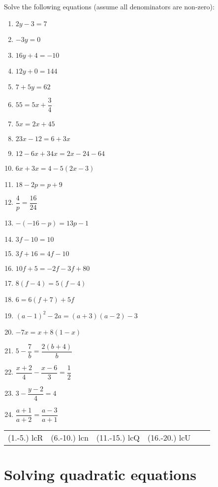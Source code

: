 \begin{exercises}{}
{
Solve the following equations (assume all denominators are non-zero): \\

\begin{multicols}{2}
\begin{enumerate}[itemsep=6pt, label=\textbf{\arabic*}. ] 
\item   $2y-3=7$
\item   $-3y=0$        
\item   $16y+4=-10$        
\item   $12y+0=144$
\item   $7+5y=62$       
\item  $55=5x+\dfrac{3}{4}$ 
\item   $5x=2x+45$        
\item  $23x-12=6+3x$
\item   $12-6x+34x=2x-24-64$
\item   $6x+3x=4-5(2x-3)$
\item   $18-2p=p+9$   
\item   $\dfrac{4}{p}=\dfrac{16}{24}$
\item   $-(-16-p)=13p-1$
\item   $3f-10=10$
\item   $3f+16=4f-10$
\item   $10f+5=-2f-3f+80$
\item   $8(f-4)=5(f-4)$
\item  $6=6(f+7)+5f$      
\item $(a-1)^{2} - 2a = (a+3)(a-2) - 3$
\item $-7x = x+8(1-x)$ 
\item $5-\dfrac{7}{b} = \dfrac{2(b+4)}{b}$
\item $\dfrac{x+2}{4} - \dfrac{x-6}{3} = \dfrac{1}{2}$
\item $ 3 - \dfrac{y-2}{4} = 4$
\item $ \dfrac{a+1}{a+2} = \dfrac{a-3}{a+1}$
  
\end{enumerate}
\end{multicols}
\practiceinfo
\par 
\par \begin{tabular}[h]{cccccc}
(1.-5.) lcR  &  (6.-10.) lcn  &  (11.-15.) lcQ  &  (16.-20.) lcU \end{tabular}
}
\end{exercises}

\section{Solving quadratic equations}

